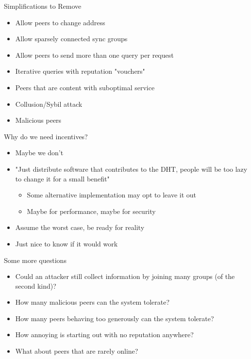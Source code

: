 \documentclass[presentation,english,usenames,dvipsnames]{beamer}
\begin{document}
\begin{frame}{Simplifications to Remove}
  \begin{itemize}
    \item Allow peers to change address
    \item Allow sparsely connected sync groups
    \item Allow peers to send more than one query per request
    \item Iterative queries with reputation "vouchers"
    \item Peers that are content with suboptimal service
    \item Collusion/Sybil attack
    \item Malicious peers
  \end{itemize}
\end{frame}

\begin{frame}{Why do we need incentives?}
  \begin{itemize}
    \item Maybe we don't
    \item "Just distribute software that contributes to the DHT, people will be
          too lazy to change it for a small benefit"
          \begin{itemize}
            \item Some alternative implementation may opt to leave it out
            \item Maybe for performance, maybe for security
          \end{itemize}
    \item Assume the worst case, be ready for reality
    \item Just nice to know if it would work
  \end{itemize}
\end{frame}

\begin{frame}{Some more questions}
  \begin{itemize}
    \item Could an attacker still collect information by joining many groups (of
          the second kind)?
    \item How many malicious peers can the system tolerate?
    \item How many peers behaving too generously can the system tolerate?
    \item How annoying is starting out with no reputation anywhere?
    \item What about peers that are rarely online?
  \end{itemize}
\end{frame}
\end{document}
